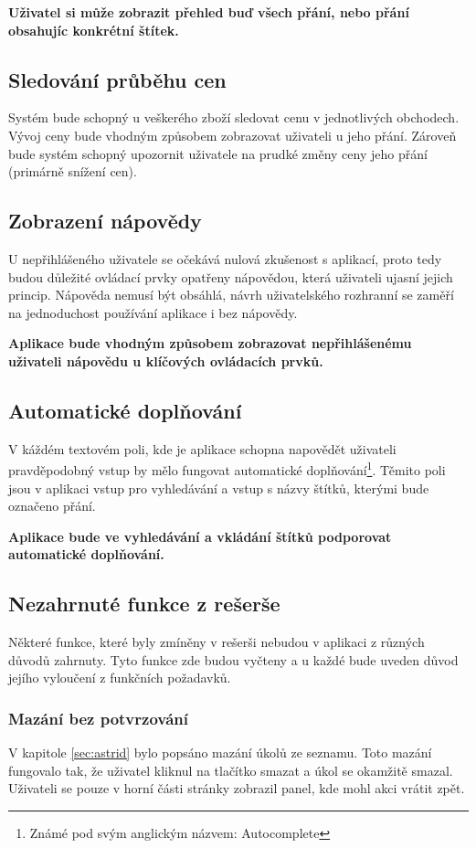 \textbf{Uživatel si může zobrazit přehled buď všech přání, nebo přání obsahujíc konkrétní štítek.}

\subsection{Sledování průběhu cen}
Systém bude schopný u veškerého zboží sledovat cenu v jednotlivých obchodech. Vývoj ceny bude vhodným způsobem zobrazovat uživateli u jeho přání. Zároveň bude systém schopný upozornit uživatele na prudké změny ceny jeho přání (primárně snížení cen).

\subsection{Zobrazení nápovědy}
U nepřihlášeného uživatele se očekává nulová zkušenost s aplikací, proto tedy budou důležité ovládací prvky opatřeny nápovědou, která uživateli ujasní jejich princip. Nápověda nemusí být obsáhlá, návrh uživatelského rozhranní se zaměří na jednoduchost používání aplikace i bez nápovědy.

\textbf{Aplikace bude vhodným způsobem zobrazovat nepřihlášenému uživateli nápovědu u klíčových ovládacích prvků.}

\subsection{Automatické doplňování}
V káždém textovém poli, kde je aplikace schopna napovědět uživateli pravděpodobný vstup by mělo fungovat automatické doplňování\footnote{Známé pod svým anglickým názvem: Autocomplete}. Těmito poli jsou v aplikaci vstup pro vyhledávání a vstup s názvy štítků, kterými bude označeno přání.

\textbf{Aplikace bude ve vyhledávání a vkládání štítků podporovat automatické doplňování.}

\subsection{Nezahrnuté funkce z rešerše}
Některé funkce, které byly zmíněny v rešerši nebudou v aplikaci z různých důvodů zahrnuty. Tyto funkce zde budou vyčteny a u každé bude uveden důvod jejího vyloučení z funkčních požadavků.

\subsubsection{Mazání bez potvrzování}
V kapitole \ref{sec:astrid} bylo popsáno mazání úkolů ze seznamu. Toto mazání fungovalo tak, že uživatel kliknul na tlačítko smazat a úkol se okamžitě smazal. Uživateli se pouze v horní části stránky zobrazil panel, kde mohl akci vrátit zpět.

